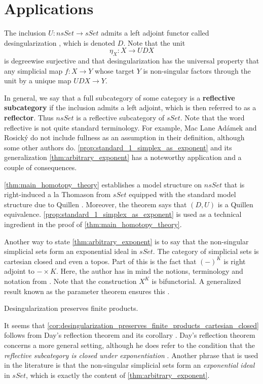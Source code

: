 

\section{Applications}
\label{sec:app}

The inclusion $U:nsSet\to sSet$ admits a left adjoint functor called desingularization \cite[Rem.~2.2.12.,~p.~39]{WJR13}, which is denoted $D$. Note that the unit
\[\eta _X:X\to UDX\]
is degreewise surjective and that desingularization has the universal property that any simplicial map $f:X\to Y$ whose target $Y$ is non-singular factors through the unit by a unique map $UDX\to Y$.

In general, we say that a full subcategory of some category is a \textbf{reflective subcategory} if the inclusion admits a left adjoint, which is then referred to as a \textbf{reflector}. Thus $nsSet$ is a reflective subcategory of $sSet$. Note that the word reflective is not quite standard terminology. For example, Mac Lane \cite[§IV.3]{ML98} Adámek and Rosický \cite[p.~1306]{AR15} do not include fullness as an assumption in their definition, although some other authors do. \cref{prop:standard_1_simplex_as_exponent} and its generalization \cref{thm:arbitrary_exponent} has a noteworthy application and a couple of consequences.

\cref{thm:main_homotopy_theory} establishes a model structure on $nsSet$ that is right-induced a la Thomason \cite{Th80} from $sSet$ equipped with the standard model structure due to Quillen \cite{Qu67}. Moreover, the theorem says that $(D,U)$ is a Quillen equivalence. \cref{prop:standard_1_simplex_as_exponent} is used as a technical ingredient in the proof of \cref{thm:main_homotopy_theory}.

Another way to state \cref{thm:arbitrary_exponent} is to say that the non-singular simplicial sets form an exponential ideal in $sSet$. The category of simplicial sets is cartesian closed and even a topos. Part of this is the fact that $(-)^K$ is right adjoint to $-\times K$. Here, the author has in mind the notions, terminology and notation from \cite[§IV.6--§IV.10]{ML98}. Note that the construction $X^K$ is bifunctorial. A generalized result known as the parameter theorem ensures this \cite[p.~102]{ML98}.
\begin{corollary}\label{cor:desingularization_preserves_finite_products_cartesian_closed}
Desingularization preserves finite products.
\end{corollary}
\noindent It seems that \cref{cor:desingularization_preserves_finite_products_cartesian_closed} follows from Day's reflection theorem \cite[Thm.~1.2]{Da72} and its corollary \cite[Cor.~2.1]{Da72}. Day's reflection theorem concerns a more general setting, although he does refer to the condition that the \emph{reflective subcategory is closed under exponentiation} \cite[§0]{Da72}. Another phrase that is used in the literature is that the non-singular simplicial sets form an \emph{exponential ideal} in $sSet$, which is exactly the content of \cref{thm:arbitrary_exponent}.

